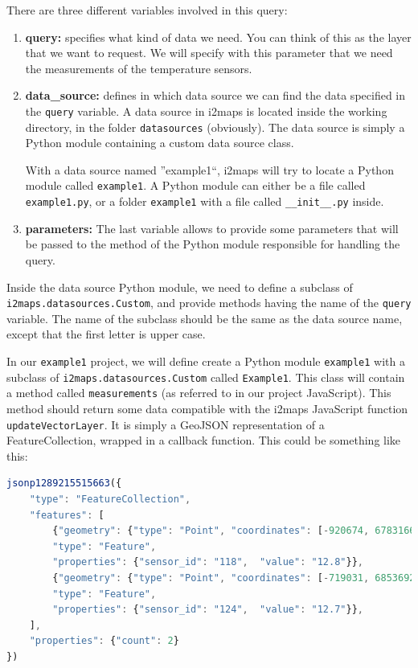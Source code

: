\documentclass[11pt]{article}
\begin{document}
There are three different variables involved in this query:
\begin{enumerate}
\item \textbf{query: }specifies what kind of data we need. You can think of this as the layer that we want to request. We will specify with this parameter that we need the measurements of the temperature sensors.
\item \textbf{data\_source: }defines in which data source we can find the data specified in the \texttt{query} variable. A data source in i2maps is located inside the working directory, in the folder \texttt{datasources} (obviously). The data source is simply a Python module containing a custom data source class.

With a data source named ''example1``, i2maps will try to locate a Python module called \texttt{example1}. A Python module can either be a file called \texttt{example1.py}, or a folder \texttt{example1} with a file called \verb=__init__.py= inside.

\item \textbf{parameters: }The last variable allows to provide some parameters that will be passed to the method of the Python module responsible for handling the query.

\end{enumerate}

Inside the data source Python module, we need to define a subclass of \texttt{i2maps.datasources.Custom}, and provide methods having the name of the \texttt{query} variable. The name of the subclass should be the same as the data source name, except that the first letter is upper case.

In our \texttt{example1} project, we will define create a Python module \texttt{example1} with a subclass of \texttt{i2maps.datasources.Custom} called \texttt{Example1}. This class will contain a method called \texttt{measurements} (as referred to in our project JavaScript). This method should return some data compatible with the i2maps JavaScript function \texttt{updateVectorLayer}. It is simply a GeoJSON representation of a FeatureCollection, wrapped in a callback function. This could be something like this:

\begin{lstlisting}[language=JavaScript]
jsonp1289215515663({
	"type": "FeatureCollection", 
	"features": [
		{"geometry": {"type": "Point", "coordinates": [-920674, 6783166]}, 
		"type": "Feature", 
		"properties": {"sensor_id": "118",  "value": "12.8"}}, 
		{"geometry": {"type": "Point", "coordinates": [-719031, 6853692]}, 
		"type": "Feature", 
		"properties": {"sensor_id": "124",  "value": "12.7"}},
	], 
	"properties": {"count": 2}
})
\end{lstlisting}
\end{document}
